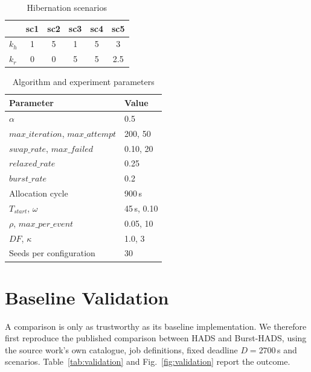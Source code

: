 \documentclass[conference]{IEEEtran}
\begin{document}
\begin{table}[t]
\caption{Hibernation scenarios}
\label{tab:scenarios}
\centering
\footnotesize
\begin{tabular}{lccccc}
\toprule
 & sc1 & sc2 & sc3 & sc4 & sc5 \\
\midrule
$k_h$ & 1 & 5 & 1 & 5 & 3 \\
$k_r$ & 0 & 0 & 5 & 5 & 2.5 \\
\bottomrule
\end{tabular}
\end{table}

\begin{table}[t]
\caption{Algorithm and experiment parameters}
\label{tab:params}
\centering
\footnotesize
\begin{tabular}{ll}
\toprule
Parameter & Value \\
\midrule
$\alpha$ & 0.5 \\
$\mathit{max\_iteration}$, $\mathit{max\_attempt}$ & 200, 50 \\
$\mathit{swap\_rate}$, $\mathit{max\_failed}$ & 0.10, 20 \\
$\mathit{relaxed\_rate}$ & 0.25 \\
$\mathit{burst\_rate}$ & 0.2 \\
Allocation cycle & 900\,s \\
$T_{\mathit{start}}$, $\omega$ & 45\,s, 0.10 \\
$\rho$, $\mathit{max\_per\_event}$ & 0.05, 10 \\
$\mathit{DF}$, $\kappa$ & 1.0, 3 \\
Seeds per configuration & 30 \\
\bottomrule
\end{tabular}
\end{table}

\section{Baseline Validation}
\label{sec:validation}

A comparison is only as trustworthy as its baseline implementation. We
therefore first reproduce the published comparison between HADS and Burst-HADS,
using the source work's own catalogue, job definitions, fixed deadline
$D=2700$\,s and scenarios. Table~\ref{tab:validation} and
Fig.~\ref{fig:validation} report the outcome.
\end{document}
